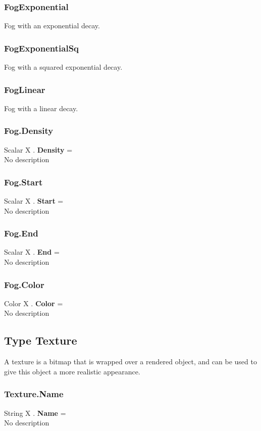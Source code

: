 \documentclass[10pt]{book}
\begin{document}
\subsubsection{FogExponential \label{T:FogType|FogExponential}}
Fog with an exponential decay.

\subsubsection{FogExponentialSq \label{T:FogType|FogExponentialSq}}
Fog with a squared exponential decay.

\subsubsection{FogLinear \label{T:FogType|FogLinear}}
Fog with a linear decay.

\subsubsection{Fog.Density \label{F:Fog:Density}}
Scalar X . \textbf{Density} = \\
No description

\subsubsection{Fog.Start \label{F:Fog:Start}}
Scalar X . \textbf{Start} = \\
No description

\subsubsection{Fog.End \label{F:Fog:End}}
Scalar X . \textbf{End} = \\
No description

\subsubsection{Fog.Color \label{F:Fog:Color}}
Color X . \textbf{Color} = \\
No description

\subsection{Type Texture \label{T:Texture}}
A texture is a bitmap that is wrapped over a rendered object, and can be used to give this object a more realistic appearance.

\subsubsection{Texture.Name \label{F:Texture:Name}}
String X . \textbf{Name} = \\
No description
\end{document}
